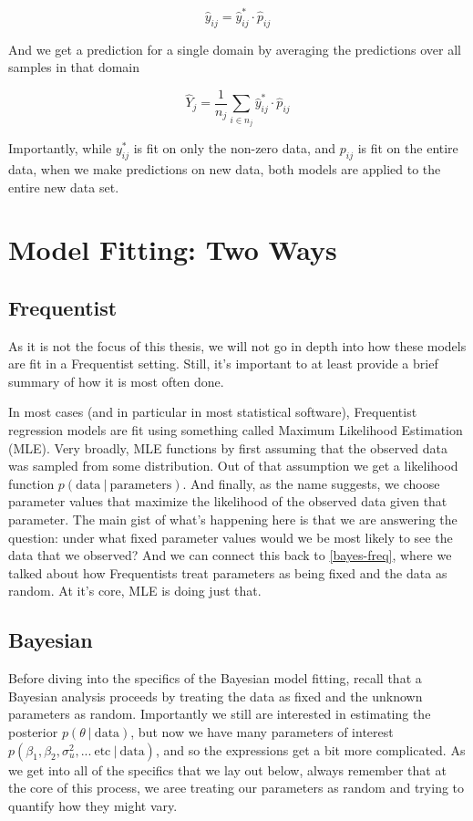 \documentclass[12pt,twoside]{reedthesis}
\begin{document}
\[
\hat{y}_{ij} = \hat{y}^*_{ij}\cdot \hat{p}_{ij}
\]

And we get a prediction for a single domain by averaging the predictions over all samples in that domain

\[
\hat{Y}_j = \frac{1}{n_j}\sum_{i \in n_j}\hat{y}^*_{ij}\cdot \hat{p}_{ij}
\]

Importantly, while \(y^*_{ij}\) is fit on only the non-zero data, and \(p_{ij}\) is fit on the entire data, when we make predictions on new data, both models are applied to the entire new data set.

\hypertarget{model-fitting-two-ways}{%
\section{Model Fitting: Two Ways}\label{model-fitting-two-ways}}

\hypertarget{frequentist}{%
\subsection{Frequentist}\label{frequentist}}

As it is not the focus of this thesis, we will not go in depth into how these models are fit in a Frequentist setting. Still, it's important to at least provide a brief summary of how it is most often done.

In most cases (and in particular in most statistical software), Frequentist regression models are fit using something called Maximum Likelihood Estimation (MLE). Very broadly, MLE functions by first assuming that the observed data was sampled from some distribution. Out of that assumption we get a likelihood function \(p(\text{data} \ | \ \text{parameters})\). And finally, as the name suggests, we choose parameter values that maximize the likelihood of the observed data given that parameter. The main gist of what's happening here is that we are answering the question: under what fixed parameter values would we be most likely to see the data that we observed? And we can connect this back to \ref{bayes-freq}, where we talked about how Frequentists treat parameters as being fixed and the data as random. At it's core, MLE is doing just that.

\hypertarget{bayesian}{%
\subsection{Bayesian}\label{bayesian}}

Before diving into the specifics of the Bayesian model fitting, recall that a Bayesian analysis proceeds by treating the data as fixed and the unknown parameters as random. Importantly we still are interested in estimating the posterior \(p(\theta \ | \ \text{data})\), but now we have many parameters of interest \(p(\beta_1, \beta_2, \sigma^2_{u}, ... \ \text{etc} \ | \ \text{data})\), and so the expressions get a bit more complicated. As we get into all of the specifics that we lay out below, always remember that at the core of this process, we aree treating our parameters as random and trying to quantify how they might vary.
\end{document}
